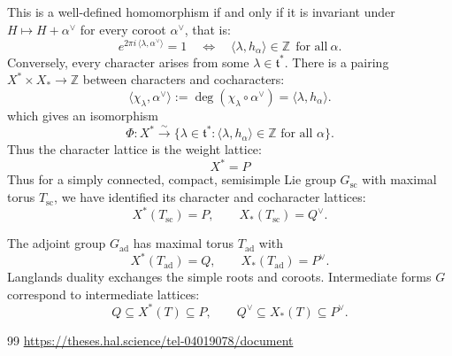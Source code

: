 \documentclass[12pt]{article}
\begin{document}
This is a well-defined homomorphism if and only if it is invariant under $H\mapsto H+\alpha^\vee$ for every coroot $\alpha^\vee$, that is:
\[
    e^{2\pi i\,\langle \lambda,\alpha^\vee\rangle}=1
    \quad\Longleftrightarrow\quad
    \langle \lambda,h_\alpha\rangle\in\mathbb{Z}\ \ \text{for all}\ \alpha.
\]
Conversely, every character arises from some $\lambda\in\mathfrak{t}^*$. There is a pairing $ X^* \times X_* \to \mathbb{Z}$
between characters and cocharacters:
\[
    \langle \chi_\lambda,\alpha^\vee \rangle := \deg(\chi_\lambda \circ \alpha^\vee) = \langle \lambda,h_\alpha\rangle.
\] which gives an isomorphism
\[
    \Phi: X^* \xrightarrow{\ \sim\ } \{ \lambda \in \mathfrak{t}^* : \langle \lambda,h_\alpha\rangle \in \mathbb{Z} \text{ for all } \alpha \}.
\]
Thus the character lattice is the weight lattice:
\[X^* = P\]
Thus for a simply connected, compact, semisimple Lie group $G_{\mathrm{sc}}$ with maximal torus $T_{\mathrm{sc}}$, we have identified its character and cocharacter lattices:
\[
    X^*(T_{\mathrm{sc}}) = P, \qquad X_*(T_{\mathrm{sc}}) = Q^\vee.
\]

The adjoint group $G_{\mathrm{ad}}$ has maximal torus $T_{\mathrm{ad}}$ with
\[
    X^*(T_{\mathrm{ad}}) = Q, \qquad X_*(T_{\mathrm{ad}}) = P^\vee.
\]
Langlands duality exchanges the simple roots and coroots. Intermediate forms $G$ correspond to intermediate lattices:
\[
    Q \subseteq X^*(T) \subseteq P, \qquad Q^\vee \subseteq X_*(T) \subseteq P^\vee.
\]


\begin{thebibliography}{99}
\url{https://theses.hal.science/tel-04019078/document}
\end{thebibliography}
\end{document}

